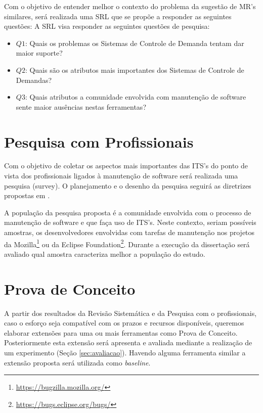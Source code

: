 \documentclass[msc,proposal,hidelot,hideabstract]{ppgccufmg} %
\begin{document}
Com o objetivo de entender melhor o contexto do problema da sugestão de MR's
similares, será realizada uma SRL que se propõe a responder as seguintes
questões:  A SRL visa responder as seguintes questões de
pesquisa:

\begin{itemize}
  \item \textbf{$Q1$}: Quais os problemas os Sistemas de Controle de Demanda tentam dar maior suporte?
  \item \textbf{$Q2$}: Quais são os atributos mais importantes dos Sistemas de
    Controle de Demandas?
  \item \textbf{$Q3$}: Quais atributos a comunidade envolvida com manutenção de
    software sente maior ausências nestas ferramentas?
  \end{itemize}

\section{Pesquisa com Profissionais}
\label{sec:survey}
Com o objetivo de coletar os aspectos mais importantes das ITS's do ponto de
vista dos profissionais ligados à manutenção de software será realizada uma
 pesquisa (survey). O planejamento e o desenho da pesquisa seguirá
as diretrizes propostas em \cite{wohlin2012experimentation}.

A população da pesquisa proposta é a comunidade envolvida com o processo de
manutenção de software e que faça uso de ITS's. Neste contexto, seriam
possíveis amostras, os desenvolvedores envolvidas com tarefas de manutenção nos
projetos da Mozilla\footnote{\url{https://bugzilla.mozilla.org/}} ou da
Eclipse Foundation\footnote{\url{https://bugs.eclipse.org/bugs/}}. Durante a
execução da dissertação será avaliado qual amostra caracteriza melhor a
população do estudo.

\section{Prova de Conceito}
\label{sec:prova-conceito}

A partir dos resultados da Revisão Sistemática e da Pesquisa com o
profissionais, caso o esforço seja compatível com os prazos e recursos disponíveis, queremos
elaborar extensões para uma ou mais ferramentas como Prova de Conceito. Posteriormente esta extensão
será apresenta e avaliada mediante a realização de um experimento (Seção
\ref{sec:avaliacao}). Havendo alguma ferramenta similar a extensão proposta será utilizada como \textit{baseline}.
\end{document}
